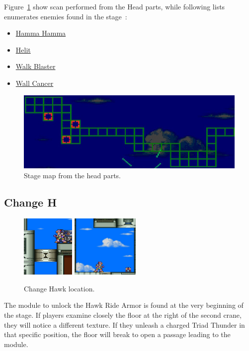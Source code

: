Figure~\ref{fig:Shipyard_map} show scan performed from the Head parts, while following lists enumerates enemies found in the stage~\cite{wiki:Shipyard}:
\begin{itemize}
	\item \hyperlink{enem:Hamma_Hamma}{Hamma Hamma}
	\item \hyperlink{enem:Helit}{Helit}
	\item \hyperlink{enem:Walk_Blaster}{Walk Blaster}
	\item \hyperlink{enem:Wall_cancer}{Wall Cancer}
\end{itemize}

\begin{figure}[htp]
	\centering
	\includegraphics[width=.7\linewidth]{figures/X3/Crush_crawfish/map.jpg}
	\caption{Stage map from the head parts.}
	\label{fig:Shipyard_map}
\end{figure}

\subsection{Change H}
\begin{figure}[htp]
	\centering
	\includegraphics[height=3cm]{figures/X3/Crush_crawfish/hawk_1.jpg}
	\includegraphics[height=3cm]{figures/X3/Crush_crawfish/hawk_2.jpg}
	\caption{Change Hawk location.}
\end{figure}
The module to unlock the Hawk Ride Armor is found at the very beginning of the stage. If players examine closely the floor at the right of the second crane, they will notice a different texture. If they unleash a charged Triad Thunder in that specific position, the floor will break to open a passage leading to the module.


